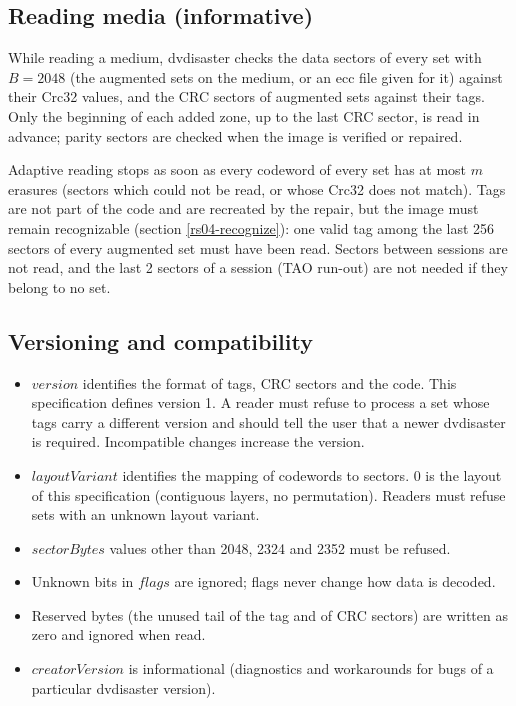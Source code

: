 \subsection{Reading media (informative)}
\label{rs04-reading}

While reading a medium, dvdisaster checks the data sectors of every set
with $B = 2048$ (the augmented sets on the medium, or an ecc file given for
it) against their Crc32 values, and the CRC sectors of augmented sets
against their tags. Only the beginning of each added zone, up to the last
CRC sector, is read in advance; parity sectors are checked when the image
is verified or repaired.

\medskip

Adaptive reading stops as soon as every codeword of every set has at most
$m$ erasures (sectors which could not be read, or whose Crc32 does not
match). Tags are not part of the code and are recreated by the repair, but
the image must remain recognizable (section \ref{rs04-recognize}): one
valid tag among the last 256 sectors of every augmented set must have been
read. Sectors between sessions are not read, and the last 2 sectors of a
session (TAO run-out) are not needed if they belong to no set.

\subsection{Versioning and compatibility}
\label{rs04-versions}

\begin{itemize}
\item $version$ identifies the format of tags, CRC sectors and the code.
  This specification defines version 1. A reader must refuse to process a
  set whose tags carry a different version and should tell the user that a
  newer dvdisaster is required. Incompatible changes increase the version.
\item $layoutVariant$ identifies the mapping of codewords to sectors.
  0 is the layout of this specification (contiguous layers, no
  permutation). Readers must refuse sets with an unknown layout variant.
\item $sectorBytes$ values other than 2048, 2324 and 2352 must be refused.
\item Unknown bits in $flags$ are ignored; flags never change how data
  is decoded.
\item Reserved bytes (the unused tail of the tag and of CRC sectors) are
  written as zero and ignored when read.
\item $creatorVersion$ is informational (diagnostics and workarounds for
  bugs of a particular dvdisaster version).
\end{itemize}

